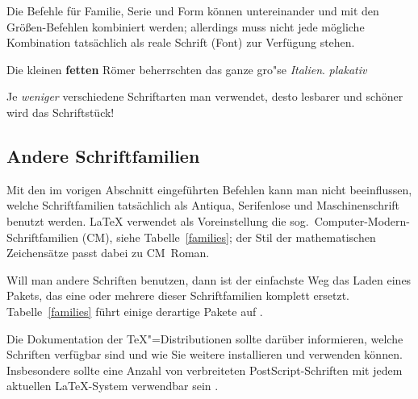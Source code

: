 Die Befehle für Familie, Serie und Form können untereinander und mit den
Größen-Befehlen kombiniert werden;  allerdings muss nicht jede
mögliche Kombination tatsächlich als reale Schrift (Font)
zur Verfügung stehen.

\begin{LTXexample}
{\small Die kleinen \textbf{fetten}
Römer
beherrschten }{\large das
ganze gro"se \textit{Italien}.}
{\Large\sffamily\slshape plakativ}
\end{LTXexample}


Je \emph{weniger} verschiedene Schriftarten man verwendet, desto
lesbarer und schöner wird das Schriftstück!


\subsection{Andere Schriftfamilien}
Mit den im vorigen Abschnitt eingeführten Befehlen kann man nicht beeinflussen,
welche Schriftfamilien tatsächlich als Antiqua, Serifenlose und
Maschinenschrift benutzt werden.  \LaTeX{} verwendet als Voreinstellung
die sog.\ Computer-Modern-Schriftfamilien (CM), siehe Tabelle~\ref{families};
der Stil der mathematischen Zeichensätze passt dabei zu CM~Roman.

Will man andere Schriften benutzen, dann ist der einfachste Weg 
das Laden eines Pakets, das eine oder mehrere dieser Schriftfamilien 
komplett ersetzt.
Tabelle~\ref{families} führt einige derartige Pakete auf%
.

Die Dokumentation der \TeX"=Distributionen sollte darüber
informieren, welche Schriften verfügbar sind
und wie Sie weitere installieren und verwenden können.
Insbesondere sollte eine Anzahl von verbreiteten PostScript-Schriften
mit jedem aktuellen \LaTeX-System verwendbar sein \cite{postscript}.


